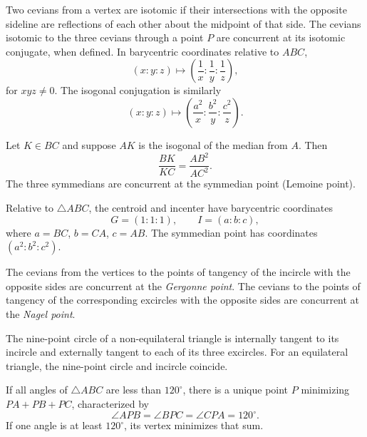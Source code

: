 \begin{definition}
Two cevians from a vertex are isotomic if their intersections with the opposite sideline are reflections of each other about the midpoint of that side. The cevians isotomic to the three cevians through a point $P$ are concurrent at its isotomic conjugate, when defined. In barycentric coordinates relative to $ABC$,
\[
 (x:y:z)\longmapsto\left(\frac1x:\frac1y:\frac1z\right),
\]
for $xyz\ne0$. The isogonal conjugation is similarly
\[
 (x:y:z)\longmapsto\left(\frac{a^2}x:\frac{b^2}y:\frac{c^2}z\right).
\]
\end{definition}

\begin{theorem}
Let $K\in BC$ and suppose $AK$ is the isogonal of the median from $A$. Then
\[
 \frac{BK}{KC}=\frac{AB^2}{AC^2}.
\]
The three symmedians are concurrent at the symmedian point (Lemoine point).
\end{theorem}

\begin{proposition}
Relative to $\triangle ABC$, the centroid and incenter have barycentric coordinates
\[
 G=(1:1:1), \qquad I=(a:b:c),
\]
where $a=BC$, $b=CA$, $c=AB$. The symmedian point has coordinates $(a^2:b^2:c^2)$.
\end{proposition}

\begin{theorem}
The cevians from the vertices to the points of tangency of the incircle with the opposite sides are concurrent at the \emph{Gergonne point}. The cevians to the points of tangency of the corresponding excircles with the opposite sides are concurrent at the \emph{Nagel point}.
\end{theorem}

\begin{theorem}
The nine-point circle of a non-equilateral triangle is internally tangent to its incircle and externally tangent to each of its three excircles. For an equilateral triangle, the nine-point circle and incircle coincide.
\end{theorem}

\begin{theorem}
If all angles of $\triangle ABC$ are less than $120^\circ$, there is a unique point $P$ minimizing $PA+PB+PC$, characterized by
\[
 \angle APB=\angle BPC=\angle CPA=120^\circ.
\]
If one angle is at least $120^\circ$, its vertex minimizes that sum.
\end{theorem}


